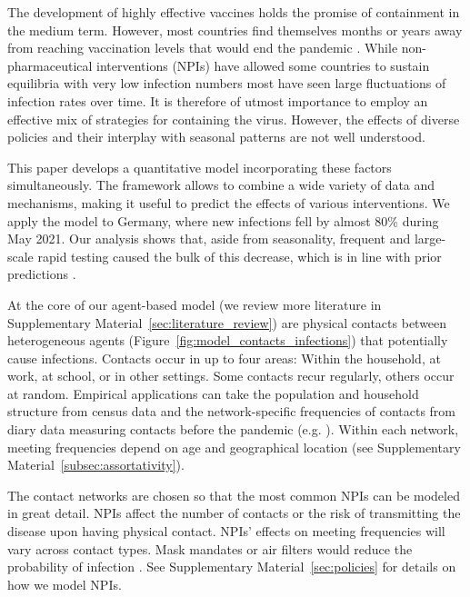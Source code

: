 The development of highly effective vaccines holds the promise of containment in the
medium term. However, most countries find themselves months or years away from reaching
vaccination levels that would end the pandemic \citep{Mathieu2021}. While
non-pharmaceutical interventions (NPIs) have allowed some countries to sustain
equilibria with very low infection numbers \citep{Contreras2021} most have seen large
fluctuations of infection rates over time. It is therefore of utmost importance to
employ an effective mix of strategies for containing the virus. However, the effects of
diverse policies and their interplay with seasonal patterns are not well understood.

This paper develops a quantitative model incorporating these factors simultaneously. The
framework allows to combine a wide variety of data and mechanisms, making it useful to
predict the effects of various interventions. We apply the model to Germany, where new
infections fell by almost 80\% during May 2021. Our analysis shows that, aside from
seasonality, frequent and large-scale rapid testing caused the bulk of this decrease,
which is in line with prior predictions \citep{Mina2021}.

At the core of our agent-based model \cite{Aleta2020,Hinch2020} (we review more
literature in Supplementary Material~\ref{sec:literature_review}) are physical contacts
between heterogeneous agents (Figure~\ref{fig:model_contacts_infections}) that
potentially cause infections. Contacts occur in up to four areas: Within the
household, at work, at school, or in other settings. Some contacts recur regularly,
others occur at random. Empirical applications can take the population and household
structure from census data and the network-specific frequencies of contacts from diary
data measuring contacts before the pandemic (e.g. \cite{Mossong2008,Hoang2019}). Within
each network, meeting frequencies depend on age and geographical location (see
Supplementary Material~\ref{subsec:assortativity}).

The contact networks are chosen so that the most common NPIs can be modeled in great
detail. NPIs affect the number of contacts or the risk of transmitting the disease upon
having physical contact. NPIs' effects on meeting frequencies will vary across contact
types. Mask mandates or air filters would reduce the probability of infection
\citep{Lessler2021, Cheng2021}. See Supplementary Material~\ref{sec:policies} for
details on how we model NPIs.

